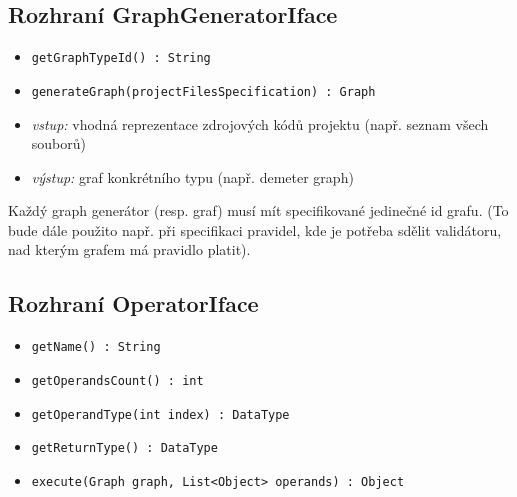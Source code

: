 \subsection{Rozhraní GraphGeneratorIface}
\begin{itemize}
\item \verb+getGraphTypeId() : String+
\item \verb+generateGraph(projectFilesSpecification) : Graph+
\end{itemize}
\begin{itemize}
\item \emph{vstup:} vhodná reprezentace zdrojových kódů projektu (např. seznam všech souborů)
\item \emph{výstup:} graf konkrétního typu (např. demeter graph)
\end{itemize}

Každý graph generátor (resp. graf) musí mít specifikované jedinečné id grafu. (To bude dále použito např. při specifikaci pravidel, kde je potřeba sdělit validátoru, nad kterým grafem má pravidlo platit).

\subsection{Rozhraní OperatorIface}

\begin{itemize}
\item \verb-getName() : String-
\item \verb-getOperandsCount() : int-
\item \verb-getOperandType(int index) : DataType-
\item \verb-getReturnType() : DataType-
\item \verb-execute(Graph graph, List<Object> operands) : Object-
\end{itemize}


